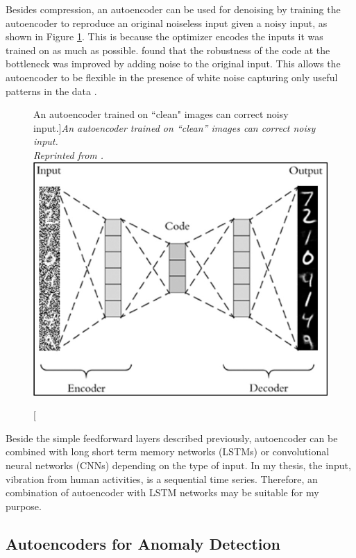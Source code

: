 Besides compression, an autoencoder can be used for denoising by training the autoencoder to reproduce an original noiseless input given a noisy input, as shown in Figure \ref{fig:ae_2}. This is because the optimizer encodes the inputs it was trained on as much as possible. \citeauthor{vincent_larochelle_bengio_manzagol_2008} \citeyear{vincent_larochelle_bengio_manzagol_2008} found that the robustness of the code at the bottleneck was improved by adding noise to the original input. This allows the autoencoder to be flexible in the presence of white noise capturing only useful patterns in the data \cite{vincent10a}.


\begin{figure}[H]
  \centering
  \caption[An autoencoder trained on ``clean" images can correct noisy input.]{\emph{An autoencoder trained on ``clean'' images can correct noisy input. \\
      Reprinted from \citeauthor{rosebrock_2020} \citeyear{rosebrock_2020}.}}\label{fig:ae_2}
  \includegraphics[scale = 0.4]{figures/ae_2.jpg}
\end{figure}


Beside the simple feedforward layers described previously, autoencoder can be combined with long short term memory networks (LSTMs) or convolutional neural networks (CNNs) depending on the type of input. In my thesis, the input, vibration from human activities, is a sequential time series. Therefore, an combination of autoencoder with LSTM networks may be suitable for my purpose.

\subsection{Autoencoders for Anomaly Detection}


